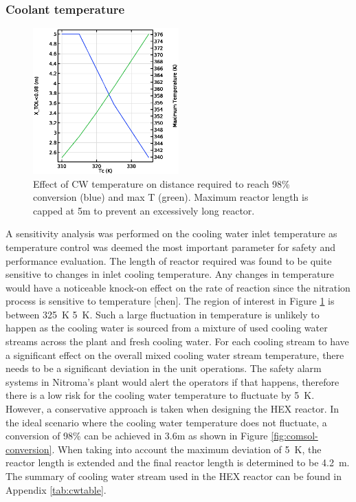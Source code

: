 \subsubsection{Coolant temperature}
\begin{figure}
    \vspace{-\intextsep}
    \includegraphics[width=0.5\textwidth]{figures/S4-CW-X-T.eps}
    \caption{Effect of CW temperature on distance required to reach 98\% conversion (blue) and max T (green). Maximum reactor length is capped at 5m to prevent an excessively long reactor.}
    \label{fig:comsol-S4-CW-X-T}
\end{figure}
A sensitivity analysis was performed on the cooling water inlet temperature as temperature control was deemed the most important parameter for safety and performance evaluation. The length of reactor required was found to be quite sensitive to changes in inlet cooling temperature. Any changes in temperature would have a noticeable knock-on effect on the rate of reaction since the nitration process is sensitive to temperature [chen]. The region of interest in Figure \ref{fig:comsol-S4-CW-X-T} is between \SI{325}{\K} \pm \SI{5}{\K}. Such a large fluctuation in temperature is unlikely to happen as the cooling water is sourced from a mixture of used cooling water streams across the plant and fresh cooling water. For each cooling stream to have a significant effect on the overall mixed cooling water stream temperature, there needs to be a significant deviation in the unit operations. The safety alarm systems in Nitroma's plant would alert the operators if that happens, therefore there is a low risk for the cooling water temperature to fluctuate by \pm \SI{5}{\K}. However, a conservative approach is taken when designing the HEX reactor. In the ideal scenario where the cooling water temperature does not fluctuate, a conversion of 98\% can be achieved in 3.6m as shown in Figure \ref{fig:comsol-conversion}. When taking into account the maximum deviation of \pm \SI{5}{\K}, the reactor length is extended and the final reactor length is determined to be \SI{4.2}{\metre}. The summary of cooling water stream used in the HEX reactor can be found in Appendix \ref{tab:cwtable}.

